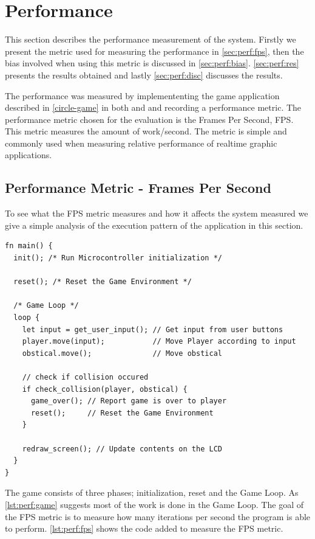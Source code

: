\section{Performance}

This section describes the performance measurement of the system.
Firstly we present the metric used for measuring the performance in \autoref{sec:perf:fps}, then the bias involved when using this metric is discussed in \autoref{sec:perf:bias}.
\autoref{sec:perf:res} presents the results obtained and lastly \autoref{sec:perf:disc} discusses the results.

The performance was measured by implemententing the game application described in \autoref{circle-game} in both \C and \rust and recording a performance metric.
The performance metric chosen for the evaluation is the Frames Per Second, FPS.
This metric measures the amount of work/second.
The metric is simple and commonly used when measuring relative performance of realtime graphic applications.

\subsection{Performance Metric - Frames Per Second}
\label{sec:perf:fps}
To see what the FPS metric measures and how it affects the system measured we give a simple analysis of the execution pattern of the application in this section.

\begin{listing}[H]
  \begin{verbatim}
fn main() {
  init(); /* Run Microcontroller initialization */

  reset(); /* Reset the Game Environment */

  /* Game Loop */
  loop {
    let input = get_user_input(); // Get input from user buttons
    player.move(input);           // Move Player according to input
    obstical.move();              // Move obstical

    // check if collision occured
    if check_collision(player, obstical) {
      game_over(); // Report game is over to player
      reset();     // Reset the Game Environment
    }

    redraw_screen(); // Update contents on the LCD
  }
}
  \end{verbatim}
  \caption{}
  \label{lst:perf:game}
\end{listing}

The game consists of three phases; initialization, reset and the Game Loop.
As \autoref{lst:perf:game} suggests most of the work is done in the Game Loop.
The goal of the FPS metric is to measure how many iterations per second the program is able to perform.
\autoref{lst:perf:fps} shows the code added to measure the FPS metric.

